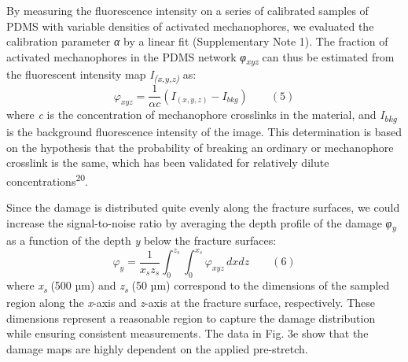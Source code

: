 \documentclass{article}
\begin{document}
By measuring the fluorescence intensity on a series of calibrated samples of PDMS with variable densities of activated mechanophores, we evaluated the calibration parameter \emph{α} by a linear fit (Supplementary Note 1). The fraction of activated mechanophores in the PDMS network \emph{φ}\textsubscript{\emph{xyz}} can thus be estimated from the fluorescent intensity map \emph{I}\textsubscript{\emph{(x,y,z)}} as:
\[ \varphi_{xyz} = \frac{1}{\alpha c}\left(I_{(x,y,z)} - I_{bkg}\right) \qquad (5) \]
where \emph{c} is the concentration of mechanophore crosslinks in the material, and \emph{I}\textsubscript{\emph{bkg}} is the background fluorescence intensity of the image. This determination is based on the hypothesis that the probability of breaking an ordinary or mechanophore crosslink is the same, which has been validated for relatively dilute concentrations\textsuperscript{20}.

Since the damage is distributed quite evenly along the fracture surfaces, we could increase the signal-to-noise ratio by averaging the depth profile of the damage \emph{φ}\textsubscript{\emph{y}} as a function of the depth \emph{y} below the fracture surfaces:
\[ \varphi_y = \frac{1}{x_s z_s}\int_0^{z_s}\int_0^{x_s} \varphi_{xyz}\, dx dz \qquad (6) \]
where \emph{x}\textsubscript{\emph{s}} (500 µm) and \emph{z}\textsubscript{\emph{s}} (50 µm) correspond to the dimensions of the sampled region along the \emph{x}-axis and \emph{z}-axis at the fracture surface, respectively. These dimensions represent a reasonable region to capture the damage distribution while ensuring consistent measurements. The data in Fig. 3e show that the damage maps are highly dependent on the applied pre-stretch.
\end{document}

